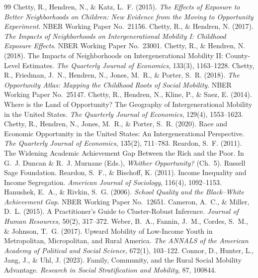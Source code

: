 \documentclass[9pt,twoside]{pnas-new}
\begin{document}
\begin{thebibliography}{99}
\small
{} Chetty, R., Hendren, N., \& Katz, L.~F. (2015).
\textit{The Effects of Exposure to Better Neighborhoods on Children: New
Evidence from the Moving to Opportunity Experiment}. NBER Working Paper
No.~21156.
 Chetty, R., \& Hendren, N. (2017). \textit{The
Impacts of Neighborhoods on Intergenerational Mobility I: Childhood Exposure
Effects}. NBER Working Paper No.~23001.
 Chetty, R., \& Hendren, N. (2018). The Impacts of
Neighborhoods on Intergenerational Mobility II: County-Level Estimates.
\textit{The Quarterly Journal of Economics}, 133(3), 1163--1228.
 Chetty, R., Friedman, J.~N., Hendren, N., Jones,
M.~R., \& Porter, S.~R. (2018). \textit{The Opportunity Atlas: Mapping the
Childhood Roots of Social Mobility}. NBER Working Paper No.~25147.
 Chetty, R., Hendren, N., Kline, P., \& Saez, E.
(2014). Where is the Land of Opportunity? The Geography of Intergenerational
Mobility in the United States. \textit{The Quarterly Journal of Economics},
129(4), 1553--1623.
 Chetty, R., Hendren, N., Jones, M.~R., \& Porter,
S.~R. (2020). Race and Economic Opportunity in the United States: An
Intergenerational Perspective. \textit{The Quarterly Journal of Economics},
135(2), 711--783.
 Reardon, S.~F. (2011). The Widening Academic Achievement
Gap Between the Rich and the Poor. In G.~J. Duncan \& R.~J. Murnane (Eds.),
\textit{Whither Opportunity?} (Ch.~5). Russell Sage Foundation.
 Reardon, S.~F., \& Bischoff, K. (2011). Income
Inequality and Income Segregation. \textit{American Journal of Sociology},
116(4), 1092--1153.
 Hanushek, E.~A., \& Rivkin, S.~G. (2006). \textit{School
Quality and the Black--White Achievement Gap}. NBER Working Paper No.~12651.
 Cameron, A.~C., \& Miller, D.~L. (2015). A
Practitioner's Guide to Cluster-Robust Inference. \textit{Journal of Human
Resources}, 50(2), 317--372.
 Weber, B.~A., Fannin, J.~M., Cordes, S.~M., \&
Johnson, T.~G. (2017). Upward Mobility of Low-Income Youth in Metropolitan,
Micropolitan, and Rural America. \textit{The ANNALS of the American Academy of
Political and Social Science}, 672(1), 103--122.
 Connor, D., Hunter, L., Jang, J., \& Uhl, J. (2023).
Family, Community, and the Rural Social Mobility Advantage. \textit{Research in
Social Stratification and Mobility}, 87, 100844.
\end{thebibliography}
\end{document}
